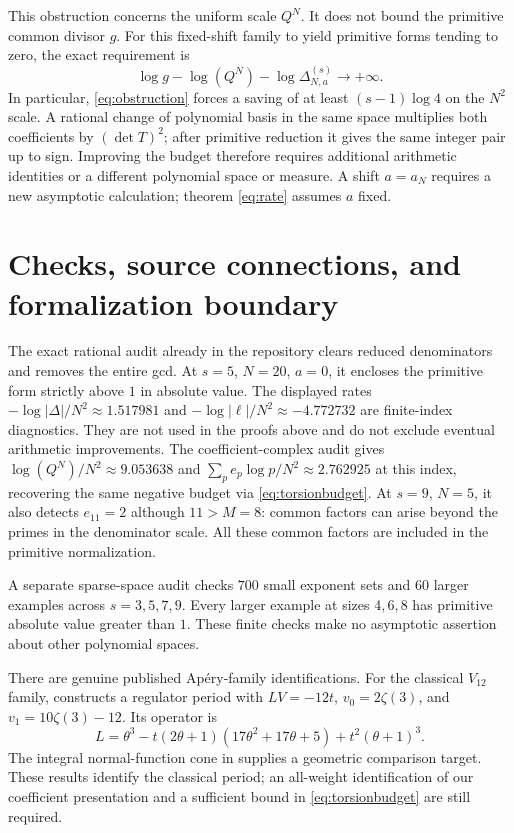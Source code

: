 \documentclass[11pt]{article}
\begin{document}
This obstruction concerns the uniform scale $Q^N$. It does not bound the
primitive common divisor $g$. For this fixed-shift family to yield
primitive forms tending to zero, the exact requirement is
\begin{equation}
 \log g-\log(Q^N)-\log\Delta_{N,a}^{(s)}\longrightarrow+\infty.
 \label{eq:remaining}
\end{equation}
In particular, \eqref{eq:obstruction} forces a saving of at least
$(s-1)\log4$ on the $N^2$ scale. A rational change of polynomial basis in
the same space multiplies both coefficients by $(\det T)^2$; after
primitive reduction it gives the same integer pair up to sign.
Improving the budget therefore requires additional arithmetic identities
or a different polynomial space or measure. A shift $a=a_N$ requires a
new asymptotic calculation; theorem \eqref{eq:rate} assumes $a$ fixed.

\section{Checks, source connections, and formalization boundary}
The exact rational audit already in the repository clears reduced
denominators and removes the entire gcd. At $s=5$, $N=20$, $a=0$, it encloses
the primitive form strictly above $1$ in absolute value. The displayed rates
$-\log|\Delta|/N^2\approx1.517981$ and
$-\log|\ell|/N^2\approx-4.772732$ are finite-index diagnostics.
They are not used in the proofs above and do not exclude eventual
arithmetic improvements.
The coefficient-complex audit gives
$\log(Q^N)/N^2\approx9.053638$ and
$\sum_p e_p\log p/N^2\approx2.762925$ at this index, recovering the same
negative budget via \eqref{eq:torsionbudget}.
At $s=9$, $N=5$, it also detects $e_{11}=2$ although $11>M=8$:
common factors can arise beyond the primes in the denominator scale.
All these common factors are included in the primitive normalization.

A separate sparse-space audit checks $700$ small exponent sets and $60$
larger examples across $s=3,5,7,9$. Every larger example at sizes $4,6,8$
has primitive absolute value greater than $1$. These finite checks make
no asymptotic assertion about other polynomial spaces.

There are genuine published Ap\'ery-family identifications. For the
classical $V_{12}$ family, \cite[Theorem 1.1, Section 5.4]{GKS} constructs
a regulator period with $LV=-12t$, $v_0=2\zeta(3)$, and
$v_1=10\zeta(3)-12$. Its operator is
\[
 L=\theta^3-t(2\theta+1)(17\theta^2+17\theta+5)+t^2(\theta+1)^3.
\]
The integral normal-function cone in \cite[Section 5]{K26} supplies a
geometric comparison target. These results identify the classical period;
an all-weight identification of our coefficient presentation and a
sufficient bound in \eqref{eq:torsionbudget} are still required.
\end{document}
